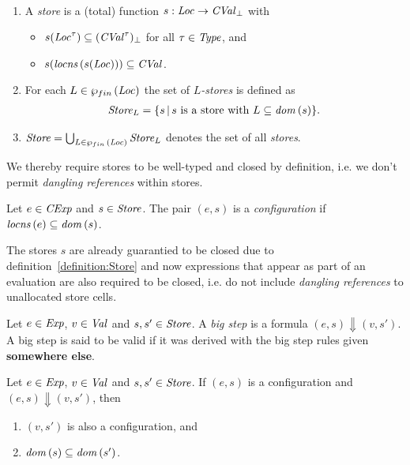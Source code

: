 \documentclass[12pt,a4paper]{report}
\newcommand{\CExp}{\nstyle{CExp}}
\newcommand{\CVal}{\nstyle{CVal}}
\begin{document}
\begin{definition}[Store] \label{definition:Store} \
  \begin{enumerate}
    \item A {\em store} is a (total) function $s:\Loc \to \CVal_\bot$ with
          \begin{itemize}
            \item $s(\Loc^\tau) \subseteq (\CVal^\tau)_\bot$ for all $\tau \in \mathit{Type}$, and
            \item $s(\locns{s(\Loc)}) \subseteq \CVal$.
          \end{itemize}

    \item For each $L\in\wp_{fin}\,(\mathit{Loc})$ the set of {\em $L$-stores} is defined as
          \[\begin{array}{l}
            \mathit{Store}_L = \{s\,|\,\text{$s$ is a store with $L\subseteq\mathit{dom}\,(s)$}\}.
          \end{array}\]

    \item $\mathit{Store} = \bigcup_{L\in\wp_{fin}\,(\mathit{Loc})} \mathit{Store}_L$ denotes the set of all {\em stores}.
  \end{enumerate}
\end{definition}

We thereby require stores to be well-typed and closed by definition, i.e. we don't permit {\em dangling
references} within stores.

\begin{definition}[Configuration]
  Let $e\in\CExp$ and $s\in\mathit{Store}$. The pair $(e,s)$ is a {\em configuration}
  if $\mathit{locns}\,(e) \subseteq \mathit{dom}\,(s)$.
\end{definition}

The stores $s$ are already guarantied to be closed due to definition~\ref{definition:Store} and
now expressions that appear as part of an evaluation are also required to be closed, i.e. do not
include {\em dangling references} to unallocated store cells.

\begin{definition}
  Let $e\in\mathit{Exp}$, $v\in\mathit{Val}$ and $s,s'\in\mathit{Store}$. A {\em big step} is a formula
  $(e,s) \Downarrow (v,s')$. A big step is said to be valid if it was derived with the
  big step rules given {\bf somewhere else}.
\end{definition}

\begin{corollary}
  Let $e\in\mathit{Exp}$, $v\in\mathit{Val}$ and $s,s'\in\mathit{Store}$. If $(e,s)$ is a configuration
  and $(e,s) \Downarrow (v,s')$, then
  \begin{enumerate}
    \item $(v,s')$ is also a configuration, and
    \item $\mathit{dom}\,(s) \subseteq \mathit{dom}\,(s')$.
  \end{enumerate}
\end{corollary}
\end{document}
